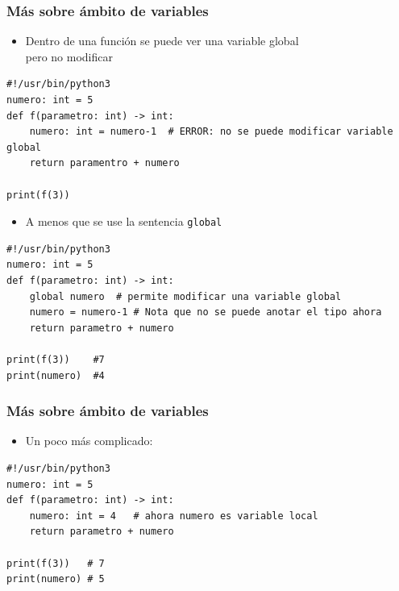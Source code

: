 \begin{frame}[fragile]
\frametitle{Más sobre ámbito de variables}

\begin{itemize}
\item 
Dentro de una función se puede ver una variable global\\
pero no modificar
\end{itemize}
  \begin{footnotesize}
\begin{verbatim}
#!/usr/bin/python3
numero: int = 5
def f(parametro: int) -> int:
    numero: int = numero-1  # ERROR: no se puede modificar variable global
    return paramentro + numero
    
print(f(3))
\end{verbatim}
  \end{footnotesize}

\begin{itemize}
\item 
A menos que se use la sentencia \verb|global|
\end{itemize}



  \begin{footnotesize}
\begin{verbatim}
#!/usr/bin/python3
numero: int = 5
def f(parametro: int) -> int:
    global numero  # permite modificar una variable global
    numero = numero-1 # Nota que no se puede anotar el tipo ahora   
    return parametro + numero
    
print(f(3))    #7
print(numero)  #4
\end{verbatim}
  \end{footnotesize}


\end{frame}

\begin{frame}[fragile]
\frametitle{Más sobre ámbito de variables}
\begin{itemize}
  
\item  Un poco más complicado:

\end{itemize}


  \begin{footnotesize}
\begin{verbatim}
#!/usr/bin/python3
numero: int = 5
def f(parametro: int) -> int:
    numero: int = 4   # ahora numero es variable local
    return parametro + numero
    
print(f(3))   # 7
print(numero) # 5
\end{verbatim}
  \end{footnotesize}

\end{frame}




